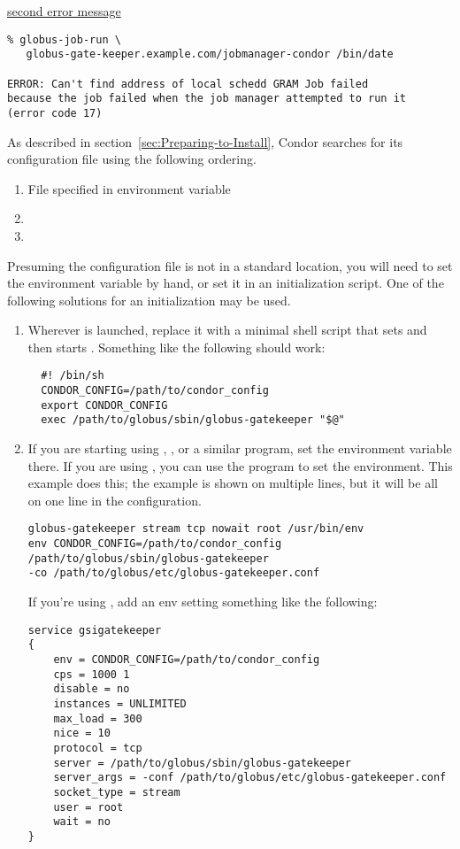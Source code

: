 \underline{second error message}
\footnotesize
\begin{verbatim}
% globus-job-run \
   globus-gate-keeper.example.com/jobmanager-condor /bin/date

ERROR: Can't find address of local schedd GRAM Job failed
because the job failed when the job manager attempted to run it
(error code 17)
\end{verbatim}
\normalsize

As described in
section~\ref{sec:Preparing-to-Install}, 
Condor searches for its configuration file using the following
ordering.
\begin{enumerate}
\item File specified in  environment variable
\item {}
\item {}
\end{enumerate}

Presuming the configuration file is not in a standard location,
you will need to set the  environment variable
by hand, or set it in an initialization script.
One of the following solutions for an initialization may be used.
\begin{enumerate}
\item 
Wherever  is launched,
replace it with a minimal shell script that sets
 and then starts .
Something like the following should work:

\footnotesize
\begin{verbatim}
  #! /bin/sh
  CONDOR_CONFIG=/path/to/condor_config
  export CONDOR_CONFIG
  exec /path/to/globus/sbin/globus-gatekeeper "$@"
\end{verbatim}
\normalsize
\item 
If you are starting  using ,
, or a similar program,
set the environment variable there.
If you are using , you can use the  program
to set the environment.
This example does this;
the example is shown on multiple lines,
but it will be all on one line in the  configuration. 
\footnotesize
\begin{verbatim}
globus-gatekeeper stream tcp nowait root /usr/bin/env
env CONDOR_CONFIG=/path/to/condor_config
/path/to/globus/sbin/globus-gatekeeper
-co /path/to/globus/etc/globus-gatekeeper.conf
\end{verbatim}
\normalsize
If you're using , add an env setting
something like the following:
\footnotesize
\begin{verbatim}
service gsigatekeeper
{
    env = CONDOR_CONFIG=/path/to/condor_config
    cps = 1000 1
    disable = no
    instances = UNLIMITED
    max_load = 300
    nice = 10
    protocol = tcp
    server = /path/to/globus/sbin/globus-gatekeeper
    server_args = -conf /path/to/globus/etc/globus-gatekeeper.conf
    socket_type = stream
    user = root
    wait = no
}
\end{verbatim}
\normalsize

\end{enumerate}

